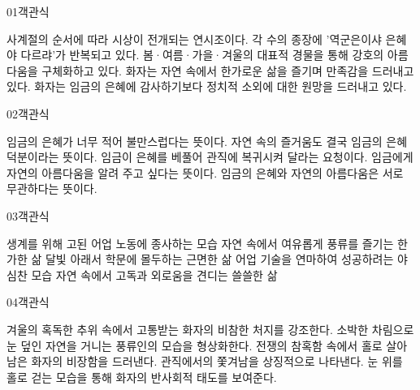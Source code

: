 \documentclass[fs85,seriesWit]{korfarm-base}
\begin{document}
\kfBeginMC
\begin{kfQBlock}{01}{객관식}
\begin{kfChoices}
\kfChoice 사계절의 순서에 따라 시상이 전개되는 연시조이다.
\kfChoice 각 수의 종장에 '역군은이샤 은혜야 다르랴'가 반복되고 있다.
\kfChoice 봄·여름·가을·겨울의 대표적 경물을 통해 강호의 아름다움을 구체화하고 있다.
\kfChoice 화자는 자연 속에서 한가로운 삶을 즐기며 만족감을 드러내고 있다.
\kfChoice 화자는 임금의 은혜에 감사하기보다 정치적 소외에 대한 원망을 드러내고 있다.
\end{kfChoices}
\end{kfQBlock}

\begin{kfQBlock}{02}{객관식}
\begin{kfChoices}
\kfChoice 임금의 은혜가 너무 적어 불만스럽다는 뜻이다.
\kfChoice 자연 속의 즐거움도 결국 임금의 은혜 덕분이라는 뜻이다.
\kfChoice 임금이 은혜를 베풀어 관직에 복귀시켜 달라는 요청이다.
\kfChoice 임금에게 자연의 아름다움을 알려 주고 싶다는 뜻이다.
\kfChoice 임금의 은혜와 자연의 아름다움은 서로 무관하다는 뜻이다.
\end{kfChoices}
\end{kfQBlock}

\begin{kfQBlock}{03}{객관식}
\begin{kfChoices}
\kfChoice 생계를 위해 고된 어업 노동에 종사하는 모습
\kfChoice 자연 속에서 여유롭게 풍류를 즐기는 한가한 삶
\kfChoice 달빛 아래서 학문에 몰두하는 근면한 삶
\kfChoice 어업 기술을 연마하여 성공하려는 야심찬 모습
\kfChoice 자연 속에서 고독과 외로움을 견디는 쓸쓸한 삶
\end{kfChoices}
\end{kfQBlock}

\begin{kfQBlock}{04}{객관식}
\begin{kfChoices}
\kfChoice 겨울의 혹독한 추위 속에서 고통받는 화자의 비참한 처지를 강조한다.
\kfChoice 소박한 차림으로 눈 덮인 자연을 거니는 풍류인의 모습을 형상화한다.
\kfChoice 전쟁의 참혹함 속에서 홀로 살아남은 화자의 비장함을 드러낸다.
\kfChoice 관직에서의 쫓겨남을 상징적으로 나타낸다.
\kfChoice 눈 위를 홀로 걷는 모습을 통해 화자의 반사회적 태도를 보여준다.
\end{kfChoices}
\end{kfQBlock}
\end{document}
